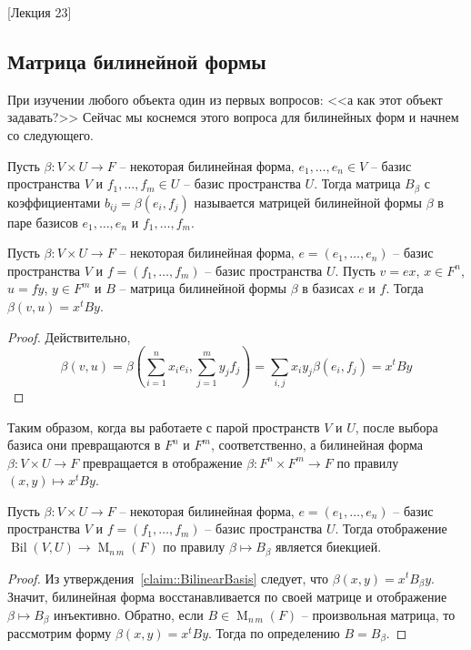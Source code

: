 [Лекция 23]


\subsection{Матрица билинейной формы}

При изучении любого объекта один из первых вопросов: <<а как этот объект задавать?>> Сейчас мы коснемся этого вопроса для билинейных форм и начнем со следующего.

\begin{definition}
Пусть $\beta\colon V\times U\to F$ -- некоторая билинейная форма,  $e_1,\ldots,e_n\in V$ -- базис пространства $V$ и $f_1,\ldots,f_m\in U$ -- базис пространства $U$.
Тогда матрица $B_\beta$ с коэффициентами $b_{ij} = \beta(e_i,f_j)$ называется матрицей билинейной формы $\beta$ в паре базисов $e_1,\ldots,e_n$ и $f_1,\ldots,f_m$.
\end{definition}

\begin{claim}
\label{claim::BilinearBasis}
Пусть $\beta\colon V\times U\to F$ -- некоторая билинейная форма,  $e = (e_1,\ldots,e_n)$ -- базис пространства $V$ и $f=(f_1,\ldots,f_m)$ -- базис пространства $U$.
Пусть $v = ex$, $x\in F^n$, $u =fy$, $y\in F^m$ и $B$ -- матрица билинейной формы $\beta$ в базисах $e$ и $f$.
Тогда $\beta(v,u) = x^t B y$.
\end{claim}
\begin{proof}
Действительно, 
\[
\beta(v,u) = \beta(\sum_{i=1}^n x_i e_i, \sum_{j=1}^m y_j f_j) = \sum_{i,j} x_iy_j\beta(e_i, f_j) = x^t B y
\]
\end{proof}

Таким образом, когда вы работаете с парой пространств $V$ и $U$, после выбора базиса они превращаются в $F^n$ и $F^m$, соответственно, а билинейная форма $\beta\colon V\times U\to F$ превращается в отображение $\beta\colon F^n \times F^m \to F$ по правилу $(x,y)\mapsto x^t B y$.

\begin{claim}
\label{claim::BilinearMatrices}
Пусть $\beta\colon V\times U\to F$ -- некоторая билинейная форма,  $e = (e_1,\ldots,e_n)$ -- базис пространства $V$ и $f=(f_1,\ldots,f_m)$ -- базис пространства $U$.
Тогда отображение $\operatorname{Bil}(V,U)\to \operatorname{M}_{n\,m}(F)$ по правилу $\beta\mapsto B_\beta$ является биекцией.
\end{claim}
\begin{proof}
Из утверждения~\ref{claim::BilinearBasis} следует, что $\beta(x,y) = x^t B_\beta y$.
Значит, билинейная форма восстанавливается по своей матрице и отображение $\beta\mapsto B_\beta$ инъективно.
Обратно, если $B\in \operatorname{M}_{n\,m}(F)$ -- произвольная матрица, то рассмотрим форму $\beta(x,y) = x^t B y$.
Тогда по определению $B = B_\beta$.
\end{proof}

